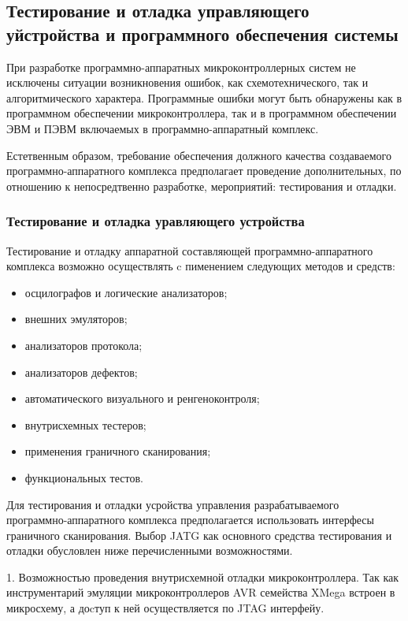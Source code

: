 \subsection{Тестирование и отладка управляющего уйстройства и программного обеспечения системы}
При разработке программно-аппаратных микроконтроллерных систем не исключены ситуации возникновения
ошибок, как схемотехнического, так и алгоритмического характера. Программные ошибки могут быть обнаружены
как в программном обеспечении микроконтроллера, так и в программном обеспечении ЭВМ и ПЭВМ включаемых
в программно-аппаратный комплекс.

Естетвенным образом, требование обеспечения должного качества создаваемого программно-аппаратного
комплекса предполагает проведение дополнительных, по отношению к непосредтвенно разработке,
мероприятий: тестирования и отладки.


\subsubsection{Тестирование и отладка уравляющего устройства}
Тестирование и отладку аппаратной составляющей программно-аппаратного комплекса возможно осуществлять
c пименением следующих методов и средств:
\begin{itemize}
	\item{} осцилографов и логические анализаторов;
	\item{} внешних эмуляторов;
	\item{} анализаторов протокола;
	\item{} анализаторов дефектов;
	\item{} автоматического визуального и ренгеноконтроля;
	\item{} внутрисхемных тестеров;
	\item{} применения граничного сканирования;
	\item{} функциональных тестов.
\end{itemize}

Для тестирования и отладки усройства управления разрабатываемого программно-аппаратного комплекса
предполагается использовать интерфесы граничного сканирования. Выбор JATG как основного
средства тестирования и отладки обусловлен ниже перечисленными возможностями.

\begin{par}
	1.	Возможностью проведения внутрисхемной отладки микроконтроллера. Так как инструментарий эмуляции микроконтроллеров AVR
	семейства XMega встроен в микросхему, а доcтуп к ней осуществляется по JTAG интерфейу.
\end{par}

